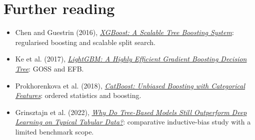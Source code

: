 \section{Further reading}
\label{sec:trees-further-reading}
\begin{itemize}
\item Chen and Guestrin (2016), \href{https://arxiv.org/abs/1603.02754}{\emph{XGBoost: A Scalable Tree Boosting System}}: regularised boosting and scalable split search.
\item Ke et al. (2017), \href{https://papers.nips.cc/paper_files/paper/2017/hash/6449f44a102fde848669bdd9eb6b76fa-Abstract.html}{\emph{LightGBM: A Highly Efficient Gradient Boosting Decision Tree}}: GOSS and EFB.
\item Prokhorenkova et al. (2018), \href{https://arxiv.org/abs/1706.09516}{\emph{CatBoost: Unbiased Boosting with Categorical Features}}: ordered statistics and boosting.
\item Grinsztajn et al. (2022), \href{https://arxiv.org/abs/2207.08815}{\emph{Why Do Tree-Based Models Still Outperform Deep Learning on Typical Tabular Data?}}: comparative inductive-bias study with a limited benchmark scope.
\end{itemize}
